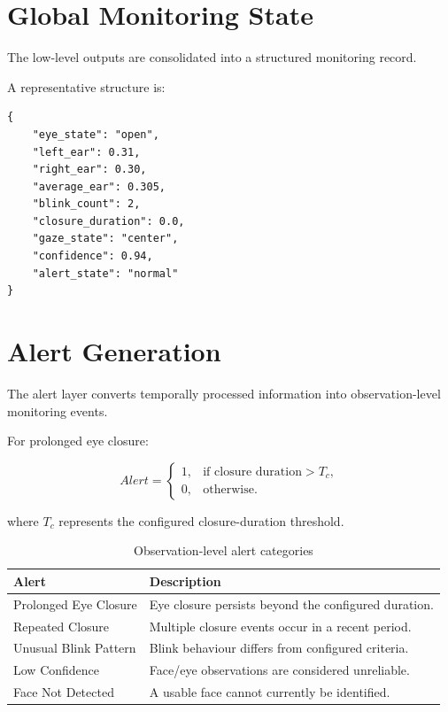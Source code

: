\documentclass{tietreport}
\begin{document}

\section{Global Monitoring State}

The low-level outputs are consolidated into a structured monitoring
record.

A representative structure is:

\begin{lstlisting}
{
    "eye_state": "open",
    "left_ear": 0.31,
    "right_ear": 0.30,
    "average_ear": 0.305,
    "blink_count": 2,
    "closure_duration": 0.0,
    "gaze_state": "center",
    "confidence": 0.94,
    "alert_state": "normal"
}
\end{lstlisting}


\section{Alert Generation}

The alert layer converts temporally processed information into
observation-level monitoring events.

For prolonged eye closure:

\begin{equation}
Alert =
\begin{cases}
1, & \text{if closure duration} > T_c,\\
0, & \text{otherwise}.
\end{cases}
\label{eq:alert}
\end{equation}

where $T_c$ represents the configured closure-duration threshold.

\begin{table}[H]
\centering
\caption{Observation-level alert categories}
\label{tab:alerts}

\begin{tabularx}{0.92\textwidth}{@{}P{4cm}Y@{}}

\toprule
\textbf{Alert} & \textbf{Description}\\
\midrule

Prolonged Eye Closure &
Eye closure persists beyond the configured duration.\\

Repeated Closure &
Multiple closure events occur in a recent period.\\

Unusual Blink Pattern &
Blink behaviour differs from configured criteria.\\

Low Confidence &
Face/eye observations are considered unreliable.\\

Face Not Detected &
A usable face cannot currently be identified.\\

\bottomrule

\end{tabularx}
\end{table}
\end{document}
